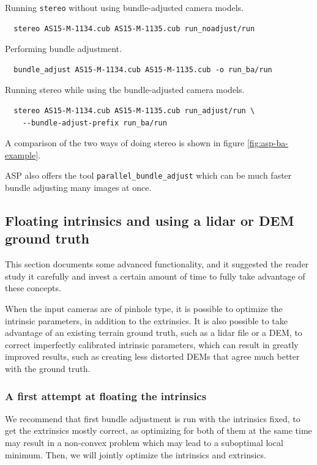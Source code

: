 Running \texttt{stereo} without using bundle-adjusted camera models.
\begin{verbatim}
  stereo AS15-M-1134.cub AS15-M-1135.cub run_noadjust/run
\end{verbatim}

Performing bundle adjustment.
\begin{verbatim}
  bundle_adjust AS15-M-1134.cub AS15-M-1135.cub -o run_ba/run
\end{verbatim}

Running stereo while using the bundle-adjusted camera models.
\begin{verbatim}
  stereo AS15-M-1134.cub AS15-M-1135.cub run_adjust/run \
    --bundle-adjust-prefix run_ba/run
\end{verbatim}

A comparison of the two ways of doing stereo is shown in figure \ref{fig:asp-ba-example}.

ASP also offers the tool \texttt{parallel\_bundle\_adjust} which can
be much faster bundle adjusting many images at once.

\subsection{Floating intrinsics and using a lidar or DEM ground truth}
\label{floatingintrinsics}

This section documents some advanced functionality, and it suggested the
reader study it carefully and invest a certain amount of time to fully
take advantage of these concepts.

When the input cameras are of pinhole type, it is possible to optimize
the intrinsic parameters, in addition to the extrinsics. It is also
possible to take advantage of an existing terrain ground truth, such as a lidar file or a DEM,
to correct imperfectly calibrated intrinsic parameters, which can result in greatly
improved results, such as creating less distorted DEMs that agree much better
with the ground truth. 

\subsubsection{A first attempt at floating the intrinsics}

We recommend that first bundle adjustment is run with the intrinsics fixed,
to get the extrinsics mostly correct, as optimizing for both of them at
the same time may result in a non-convex problem which may lead to a 
suboptimal local minimum. Then, we will jointly optimize the intrinsics
and extrinsics. 

